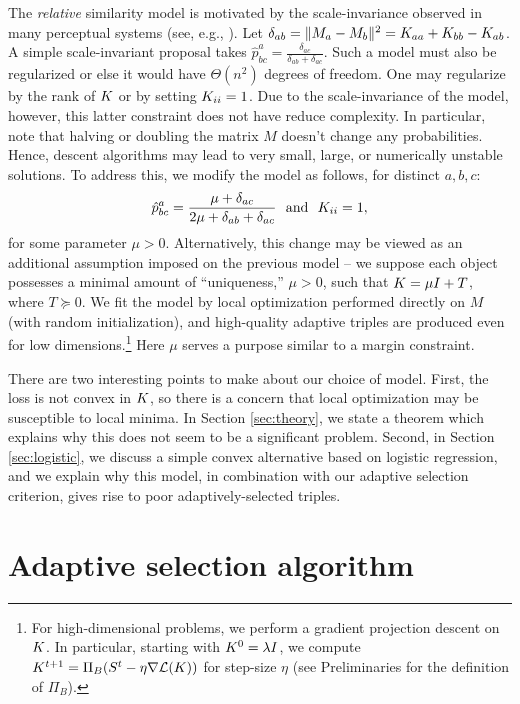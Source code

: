 \documentclass{article}
\begin{document}
The {\em relative} similarity model is motivated by the scale-invariance observed in many perceptual systems (see, e.g., \citealp{CB99}).  Let $\delta_{ab} = \|M_a-M_b\|^2=\S_{aa}+\S_{bb}-\S_{ab}$.  A simple scale-invariant proposal takes $\hat{p}^a_{bc} = \frac{\delta_{ac}}{\delta_{ab}+\delta_{ac}}$.  Such a model must also be regularized or else it would have $\Theta(n^2)$ degrees of freedom.  One may regularize by the rank of $\S$ or by setting $\S_{ii}=1$.  Due to the scale-invariance of the model, however, this latter constraint does not have reduce complexity.  In particular, note that halving or doubling the matrix $M$ doesn't change any probabilities.  Hence, descent algorithms may lead to very small, large, or numerically unstable solutions.  To address this, we modify the model as follows, for distinct $a,b,c$:
\begin{equation}
\label{eq:rel}
\hat{p}^a_{bc} =  \frac{\mu+\delta_{ac}}{2\mu+\delta_{ab}+\delta_{ac}} \ \textrm{ and }\  \S_{ii}=1,
\end{equation}
for some parameter $\mu>0$.  Alternatively, this change may be viewed as an additional assumption imposed on the previous model --  we suppose each object possesses a minimal amount of ``uniqueness,'' $\mu>0$, such that $\S = \mu I + T$, where $T \succeq 0$.  We fit the model by local optimization performed directly on $M$ (with random initialization), and high-quality adaptive triples are produced even for low dimensions.\footnote{For high-dimensional problems, we perform a gradient projection descent on $\S$.  In particular,
starting with $\S^0=\lambda I$, we compute $\S^{t+1}= \Pi_B(S^t - \eta \nabla \cL(\S))$ for step-size $\eta$ (see Preliminaries for the definition of $\Pi_B$).}  Here $\mu$ serves a purpose similar to a margin constraint.  

There are two interesting points to make about our choice of model.  First, the loss is not convex in $\S$, so there is a concern that local optimization may be susceptible to local minima.  In Section \ref{sec:theory}, we state a theorem which explains why this does not seem to be a significant problem.  Second, in Section \ref{sec:logistic}, we discuss a simple convex alternative based on logistic regression, and we explain why this model, in combination with our adaptive selection criterion, gives rise to poor adaptively-selected triples.


\section{Adaptive selection algorithm}\label{sec:ada}
\end{document}
